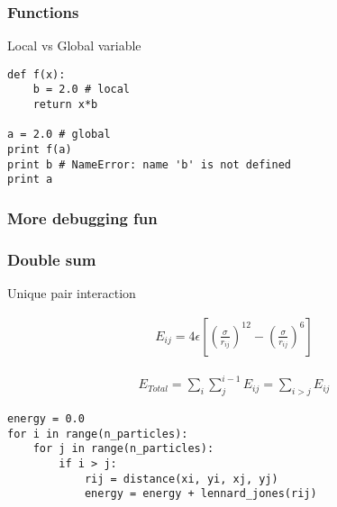 \begin{frame}[fragile]

    \frametitle{Functions}

    Local vs Global variable

    \bigskip

\begin{lstlisting}
def f(x):
    b = 2.0 # local
    return x*b

a = 2.0 # global
print f(a)
print b # NameError: name 'b' is not defined
print a
\end{lstlisting}

\end{frame}




\begin{frame}[fragile]

    \frametitle{More debugging fun}


\end{frame}


\begin{frame}[fragile]

    \frametitle{Double sum}

    Unique pair interaction

    \begin{align}
        E_{ij} = 4 \epsilon \left[ \left(\frac{\sigma}{r_{ij}} \right)^{12} - \left(\frac{\sigma}{r_{ij}} \right)^6 \right]
    \end{align}

    \begin{align}
        E_{Total} = \sum_i \sum_{j}^{i-1} E_{ij} = \sum_{i > j} E_{ij}
    \end{align}

\begin{lstlisting}
energy = 0.0
for i in range(n_particles):
    for j in range(n_particles):
        if i > j:
            rij = distance(xi, yi, xj, yj)
            energy = energy + lennard_jones(rij)
\end{lstlisting}

\end{frame}








